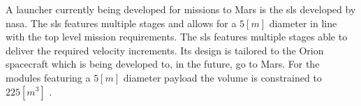 A launcher currently being developed for missions to Mars is the \gls{sls} developed by \gls{nasa}. The \gls{sls} features multiple stages and allows for a $5 [m]$ diameter in line with the top level mission requirements. The \gls{sls} features multiple stages able to deliver the required velocity increments. Its design is tailored to the Orion spacecraft which is being developed to, in the future, go to Mars. For the modules featuring a $5 [m]$ diameter payload the volume is constrained to $225 [m^3]$ \cite{NASA2014}.


